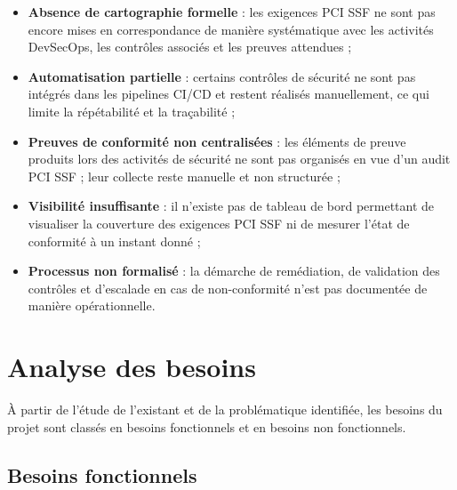 \begin{itemize}
    \item \textbf{Absence de cartographie formelle} : les exigences PCI SSF ne sont pas encore mises en correspondance de manière systématique avec les activités DevSecOps, les contrôles associés et les preuves attendues ;
    \item \textbf{Automatisation partielle} : certains contrôles de sécurité ne sont pas intégrés dans les pipelines CI/CD et restent réalisés manuellement, ce qui limite la répétabilité et la traçabilité ;
    \item \textbf{Preuves de conformité non centralisées} : les éléments de preuve produits lors des activités de sécurité ne sont pas organisés en vue d'un audit PCI SSF ; leur collecte reste manuelle et non structurée ;
    \item \textbf{Visibilité insuffisante} : il n'existe pas de tableau de bord permettant de visualiser la couverture des exigences PCI SSF ni de mesurer l'état de conformité à un instant donné ;
    \item \textbf{Processus non formalisé} : la démarche de remédiation, de validation des contrôles et d'escalade en cas de non-conformité n'est pas documentée de manière opérationnelle.
\end{itemize}

\section{Analyse des besoins}

À partir de l'étude de l'existant et de la problématique identifiée, les besoins du projet sont classés en besoins fonctionnels et en besoins non fonctionnels.

\subsection{Besoins fonctionnels}

